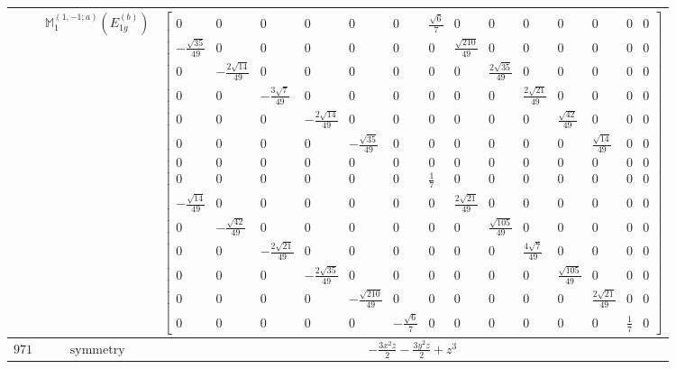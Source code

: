 \documentclass[fleqn,8pt,landscape]{jsarticle}
\begin{document}
\begin{longtable}{ccc}
$  $ & $ \mathbb{M}_{1}^{(1,-1;a)}(E_{1g}^{(b)}) $ & $ \begin{bmatrix} 0 & 0 & 0 & 0 & 0 & 0 & \frac{\sqrt{6}}{7} & 0 & 0 & 0 & 0 & 0 & 0 & 0 \\ - \frac{\sqrt{35}}{49} & 0 & 0 & 0 & 0 & 0 & 0 & \frac{\sqrt{210}}{49} & 0 & 0 & 0 & 0 & 0 & 0 \\ 0 & - \frac{2 \sqrt{14}}{49} & 0 & 0 & 0 & 0 & 0 & 0 & \frac{2 \sqrt{35}}{49} & 0 & 0 & 0 & 0 & 0 \\ 0 & 0 & - \frac{3 \sqrt{7}}{49} & 0 & 0 & 0 & 0 & 0 & 0 & \frac{2 \sqrt{21}}{49} & 0 & 0 & 0 & 0 \\ 0 & 0 & 0 & - \frac{2 \sqrt{14}}{49} & 0 & 0 & 0 & 0 & 0 & 0 & \frac{\sqrt{42}}{49} & 0 & 0 & 0 \\ 0 & 0 & 0 & 0 & - \frac{\sqrt{35}}{49} & 0 & 0 & 0 & 0 & 0 & 0 & \frac{\sqrt{14}}{49} & 0 & 0 \\ 0 & 0 & 0 & 0 & 0 & 0 & 0 & 0 & 0 & 0 & 0 & 0 & 0 & 0 \\ 0 & 0 & 0 & 0 & 0 & 0 & \frac{1}{7} & 0 & 0 & 0 & 0 & 0 & 0 & 0 \\ - \frac{\sqrt{14}}{49} & 0 & 0 & 0 & 0 & 0 & 0 & \frac{2 \sqrt{21}}{49} & 0 & 0 & 0 & 0 & 0 & 0 \\ 0 & - \frac{\sqrt{42}}{49} & 0 & 0 & 0 & 0 & 0 & 0 & \frac{\sqrt{105}}{49} & 0 & 0 & 0 & 0 & 0 \\ 0 & 0 & - \frac{2 \sqrt{21}}{49} & 0 & 0 & 0 & 0 & 0 & 0 & \frac{4 \sqrt{7}}{49} & 0 & 0 & 0 & 0 \\ 0 & 0 & 0 & - \frac{2 \sqrt{35}}{49} & 0 & 0 & 0 & 0 & 0 & 0 & \frac{\sqrt{105}}{49} & 0 & 0 & 0 \\ 0 & 0 & 0 & 0 & - \frac{\sqrt{210}}{49} & 0 & 0 & 0 & 0 & 0 & 0 & \frac{2 \sqrt{21}}{49} & 0 & 0 \\ 0 & 0 & 0 & 0 & 0 & - \frac{\sqrt{6}}{7} & 0 & 0 & 0 & 0 & 0 & 0 & \frac{1}{7} & 0 \end{bmatrix} $ \\ \hline
$ 971 $ & $ \text{symmetry} $ & $ - \frac{3 x^{2} z}{2} - \frac{3 y^{2} z}{2} + z^{3} $ \\

\end{longtable}
\end{document}
